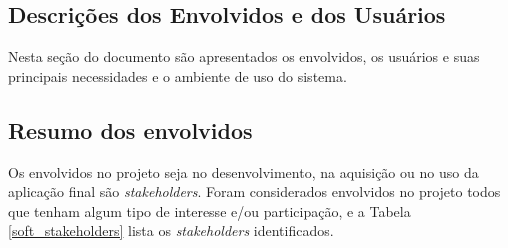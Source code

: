 \begin{apendicesenv}
   
\section*{Descrições dos Envolvidos e dos Usuários}
	
    Nesta seção do documento são apresentados os envolvidos, os usuários e suas principais necessidades e o ambiente de uso do sistema.
    \subsection*{Resumo dos envolvidos}
		
        Os envolvidos no projeto seja no desenvolvimento, na aquisição ou no uso da aplicação final são \textit{stakeholders}. Foram considerados envolvidos no projeto todos que tenham algum tipo de interesse e/ou participação, e a Tabela \ref{soft_stakeholders} lista os \textit{stakeholders} identificados.


\end{apendicesenv}
